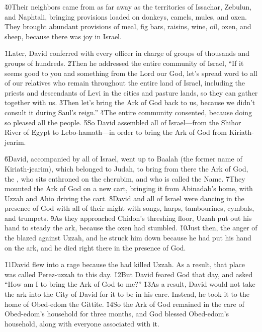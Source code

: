 \v{40}Their neighbors came from as far away as the territories of Issachar, Zebulun, and Naphtali, bringing provisions loaded on donkeys, camels, mules, and oxen. They brought abundant provisions of meal, fig bars, raisins, wine, oil, oxen, and sheep, because there was joy in Israel.

\v{1}Later, David conferred with every officer in charge of groups of thousands and groups of hundreds. \v{2}Then he addressed the entire community of Israel, ``If it seems good to you and something from the Lord our God, let's spread word to all of our relatives who remain throughout the entire land of Israel, including the priests and descendants of Levi in the cities and pasture lands, so they can gather together with us. \v{3}Then let's bring the Ark of God back to us, because we didn't consult it during Saul's reign.'' \v{4}The entire community consented, because doing so pleased all the people. \v{5}So David assembled all of Israel---from the Shihor River of Egypt to Lebo-hamath---in order to bring the Ark of God from Kiriath-jearim.

\v{6}David, accompanied by all of Israel, went up to Baalah (the former name of Kiriath-jearim), which belonged to Judah, to bring from there the Ark of God, the , who sits enthroned on the cherubim, and who is called the Name. \v{7}They mounted the Ark of God on a new cart, bringing it from Abinadab's home, with Uzzah and Ahio driving the cart. \v{8}David and all of Israel were dancing in the presence of God with all of their might with songs, harps, tambourines, cymbals, and trumpets. \v{9}As they approached Chidon's threshing floor, Uzzah put out his hand to steady the ark, because the oxen had stumbled. \v{10}Just then, the anger of the  blazed against Uzzah, and he struck him down because he had put his hand on the ark, and he died right there in the presence of God.

\v{11}David flew into a rage because the  had killed Uzzah. As a result, that place was called Perez-uzzah to this day. \v{12}But David feared God that day, and asked ``How am I to bring the Ark of God to me?'' \v{13}As a result, David would not take the ark into the City of David for it to be in his care. Instead, he took it to the home of Obed-edom the Gittite. \v{14}So the Ark of God remained in the care of Obed-edom's household for three months, and God blessed Obed-edom's household, along with everyone associated with it.

